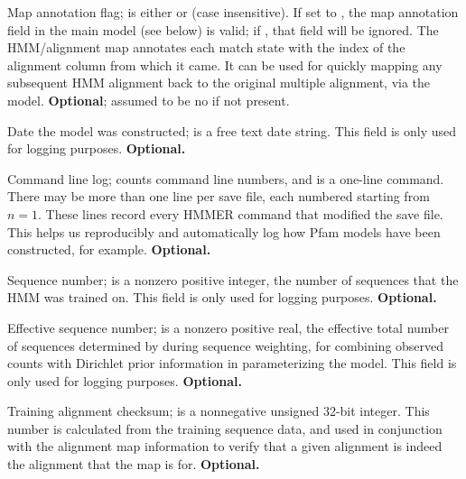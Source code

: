 \begin{sreitems}{}
\item [\emprog{MAP <s>}] Map annotation flag;  is either
 or  (case insensitive).  If set to , the
map annotation field in the main model (see below) is valid; if
, that field will be ignored.  The HMM/alignment map
annotates each match state with the index of the alignment column from
which it came. It can be used for quickly mapping any subsequent
HMM alignment back to the original multiple alignment, via the model.
\textbf{Optional}; assumed to be no if not present.

\item [\emprog{DATE <s>}] Date the model was constructed; 
is a free text date string.  This field is only used for logging
purposes. \textbf{Optional.}

\item [\emprog{COM [<n>] <s>}] Command line log;  counts
command line numbers, and  is a one-line command. There may
be more than one  line per save file, each numbered starting
from $n=1$. These lines record every HMMER command that modified the
save file. This helps us reproducibly and automatically log how Pfam
models have been constructed, for example. \textbf{Optional.}

\item [\emprog{NSEQ  <d>}] Sequence number;  is a nonzero
positive integer, the number of sequences that the HMM was trained on.
This field is only used for logging purposes.
\textbf{Optional.}

\item [\emprog{EFFN <f>}] Effective sequence number;  is a
nonzero positive real, the effective total number of sequences
determined by  during sequence weighting, for combining
observed counts with Dirichlet prior information in parameterizing the
model. This field is only used for logging purposes.
\textbf{Optional.}

\item [\emprog{CKSUM <d>}] Training alignment checksum;  is
  a nonnegative unsigned 32-bit integer. This number is calculated
  from the training sequence data, and used in conjunction with the
  alignment map information to verify that a given alignment is indeed
  the alignment that the map is for. \textbf{Optional.}


\end{sreitems}
